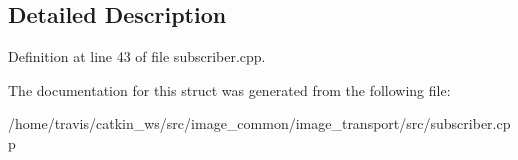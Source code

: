 \subsection{Detailed Description}


Definition at line 43 of file subscriber.\-cpp.



The documentation for this struct was generated from the following file\-:\begin{DoxyCompactItemize}
\item 
/home/travis/catkin\-\_\-ws/src/image\-\_\-common/image\-\_\-transport/src/subscriber.\-cpp\end{DoxyCompactItemize}
